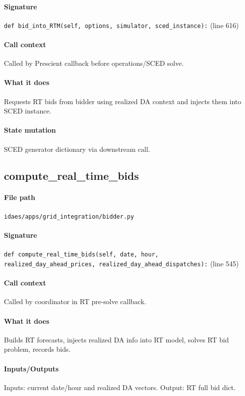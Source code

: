 \documentclass{article}
\begin{document}
\paragraph{Signature} \texttt{def bid\_into\_RTM(self, options, simulator, sced\_instance):} (line 616)
\paragraph{Call context} Called by Prescient callback before operations/SCED solve.
\paragraph{What it does} Requests RT bids from bidder using realized DA context and injects them into SCED instance.
\paragraph{State mutation} SCED generator dictionary via downstream call.

\subsection{compute\_real\_time\_bids}\label{fn:compute_real_time_bids}
\paragraph{File path} \texttt{idaes/apps/grid\_integration/bidder.py}
\paragraph{Signature} \texttt{def compute\_real\_time\_bids(self, date, hour, realized\_day\_ahead\_prices, realized\_day\_ahead\_dispatches):} (line 545)
\paragraph{Call context} Called by coordinator in RT pre-solve callback.
\paragraph{What it does} Builds RT forecasts, injects realized DA info into RT model, solves RT bid problem, records bids.
\paragraph{Inputs/Outputs} Inputs: current date/hour and realized DA vectors. Output: RT full bid dict.
\end{document}
